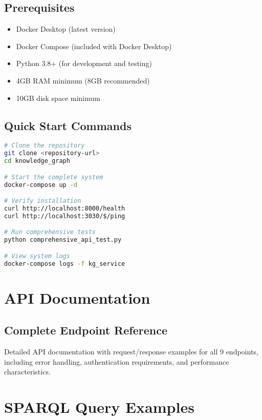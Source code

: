 \documentclass[12pt,a4paper]{article}
\begin{document}
\subsection{Prerequisites}

\begin{itemize}
    \item Docker Desktop (latest version)
    \item Docker Compose (included with Docker Desktop)
    \item Python 3.8+ (for development and testing)
    \item 4GB RAM minimum (8GB recommended)
    \item 10GB disk space minimum
\end{itemize}

\subsection{Quick Start Commands}

\begin{lstlisting}[language=bash,caption=System Installation Commands]
# Clone the repository
git clone <repository-url>
cd knowledge_graph

# Start the complete system
docker-compose up -d

# Verify installation
curl http://localhost:8000/health
curl http://localhost:3030/$/ping

# Run comprehensive tests
python comprehensive_api_test.py

# View system logs
docker-compose logs -f kg_service
\end{lstlisting}

\section{API Documentation}

\subsection{Complete Endpoint Reference}

Detailed API documentation with request/response examples for all 9 endpoints, including error handling, authentication requirements, and performance characteristics.

\section{SPARQL Query Examples}
\end{document}

